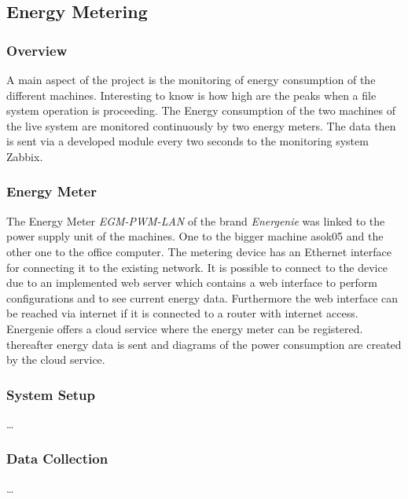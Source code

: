 \subsection{Energy Metering}

\subsubsection{Overview}
A main aspect of the project is the monitoring of energy consumption of the different machines. Interesting to know is how high are the peaks when a file system operation is proceeding. The Energy consumption of the two machines of the live system are monitored continuously by two energy meters. The data then is sent via a developed module every two seconds to the monitoring system Zabbix.

\subsubsection{Energy Meter}
The Energy Meter \textit{EGM-PWM-LAN} of the brand \textit{Energenie} was linked to the power supply unit of the machines. One to the bigger machine asok05 and the other one to the office computer. The metering device has an Ethernet interface for connecting it to the existing network. It is possible to connect to the device due to an implemented web server which contains a web interface to perform configurations and to see current energy data. Furthermore the web interface can be reached via internet if it is connected to a router with internet access. Energenie offers a cloud service where the energy meter can be registered. thereafter energy data is sent and diagrams of the power consumption are created by the cloud service.

\subsubsection{System Setup}
\dots

\subsubsection{Data Collection}
\dots
